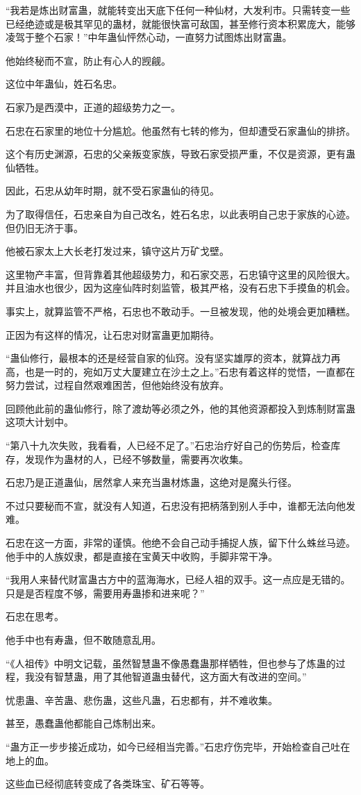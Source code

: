\begin{this_body}
“我若是炼出财富蛊，就能转变出天底下任何一种仙材，大发利市。只需转变一些已经绝迹或是极其罕见的蛊材，就能很快富可敌国，甚至修行资本积累庞大，能够凌驾于整个石家！”中年蛊仙怦然心动，一直努力试图炼出财富蛊。

他始终秘而不宣，防止有心人的觊觎。

这位中年蛊仙，姓石名忠。

石家乃是西漠中，正道的超级势力之一。

石忠在石家里的地位十分尴尬。他虽然有七转的修为，但却遭受石家蛊仙的排挤。

这个有历史渊源，石忠的父亲叛变家族，导致石家受损严重，不仅是资源，更有蛊仙牺牲。

因此，石忠从幼年时期，就不受石家蛊仙的待见。

为了取得信任，石忠亲自为自己改名，姓石名忠，以此表明自己忠于家族的心迹。但仍旧无济于事。

他被石家太上大长老打发过来，镇守这片万矿戈壁。

这里物产丰富，但背靠着其他超级势力，和石家交恶，石忠镇守这里的风险很大。并且油水也很少，因为这座仙阵时刻监管，极其严格，没有石忠下手摸鱼的机会。

事实上，就算监管不严格，石忠也不敢动手。一旦被发现，他的处境会更加糟糕。

正因为有这样的情况，让石忠对财富蛊更加期待。

“蛊仙修行，最根本的还是经营自家的仙窍。没有坚实雄厚的资本，就算战力再高，也是一时的，宛如万丈大厦建立在沙土之上。”石忠有着这样的觉悟，一直都在努力尝试，过程自然艰难困苦，但他始终没有放弃。

回顾他此前的蛊仙修行，除了渡劫等必须之外，他的其他资源都投入到炼制财富蛊这项大计划中。

“第八十九次失败，我看看，人已经不足了。”石忠治疗好自己的伤势后，检查库存，发现作为蛊材的人，已经不够数量，需要再次收集。

石忠乃是正道蛊仙，居然拿人来充当蛊材炼蛊，这绝对是魔头行径。

不过只要秘而不宣，就没有人知道，石忠没有把柄落到别人手中，谁都无法向他发难。

石忠在这一方面，非常的谨慎。他绝不会自己动手捕捉人族，留下什么蛛丝马迹。他手中的人族奴隶，都是直接在宝黄天中收购，手脚非常干净。

“我用人来替代财富蛊古方中的蓝海海水，已经人祖的双手。这一点应是无错的。只是是否程度不够，需要用寿蛊掺和进来呢？”

石忠在思考。

他手中也有寿蛊，但不敢随意乱用。

“《人祖传》中明文记载，虽然智慧蛊不像愚蠢蛊那样牺牲，但也参与了炼蛊的过程，我没有智慧蛊，用了其他智道蛊虫替代，这方面大有改进的空间。”

忧患蛊、辛苦蛊、悲伤蛊，这些凡蛊，石忠都有，并不难收集。

甚至，愚蠢蛊他都能自己炼制出来。

“蛊方正一步步接近成功，如今已经相当完善。”石忠疗伤完毕，开始检查自己吐在地上的血。

这些血已经彻底转变成了各类珠宝、矿石等等。

\end{this_body}

